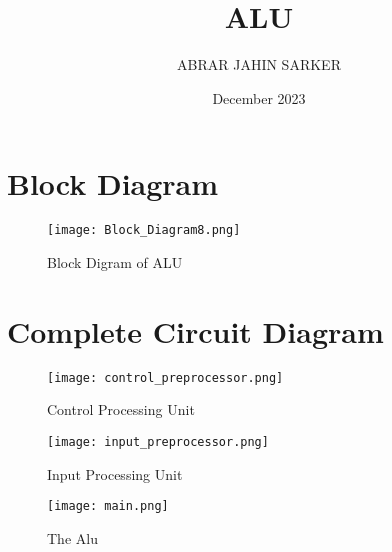 \documentclass[12pt]{article}
\title{ALU}
\author{ABRAR JAHIN SARKER}
\date{December 2023}
\begin{document}
\section{\large{Block Diagram}}
\vspace{15mm}
\begin{figure}[H]
    \centering
    \texttt{[image: Block\_Diagram8.png]}
    \caption{ Block Digram of ALU }
    \label{fig:enter-label}
\end{figure}

\section{\large{Complete Circuit Diagram}}

     \begin{figure}[H]
         \centering
         \texttt{[image: control\_preprocessor.png]}
         \caption{Control Processing Unit}
         \label{fig:alu_a}
     \end{figure}
     \begin{figure}[H]
         \centering
         \texttt{[image: input\_preprocessor.png]}
         \caption{Input Processing Unit}
         \label{fig:alu_b}
     \end{figure}
     \begin{figure}[H]
         \centering
         \texttt{[image: main.png]}
         \caption{The Alu}
         \label{fig:alu_c}
     \end{figure}
\end{document}
